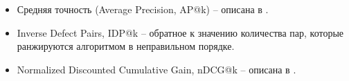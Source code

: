 \begin{itemize}
	\item Средняя точность (Average Precision, AP@k) -- описана в \cite{Hang2011}.
	\item Inverse Defect Pairs, IDP@k -- обратное к значению количества пар, которые ранжируются алгоритмом в неправильном порядке.
	\item Normalized Discounted Cumulative Gain, nDCG@k -- описана в \cite{Hang2011}.
\end{itemize}







